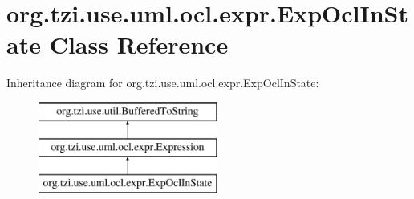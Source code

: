 \hypertarget{classorg_1_1tzi_1_1use_1_1uml_1_1ocl_1_1expr_1_1_exp_ocl_in_state}{\section{org.\-tzi.\-use.\-uml.\-ocl.\-expr.\-Exp\-Ocl\-In\-State Class Reference}
\label{classorg_1_1tzi_1_1use_1_1uml_1_1ocl_1_1expr_1_1_exp_ocl_in_state}
}
Inheritance diagram for org.\-tzi.\-use.\-uml.\-ocl.\-expr.\-Exp\-Ocl\-In\-State\-:\begin{figure}[H]
\begin{center}
\leavevmode
\includegraphics[height=3.000000cm]{classorg_1_1tzi_1_1use_1_1uml_1_1ocl_1_1expr_1_1_exp_ocl_in_state}
\end{center}
\end{figure}
